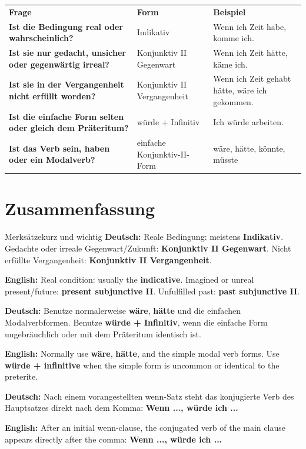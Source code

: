 \documentclass[a4paper,11pt]{article}
\newcommand{\GermanText}[1]{\textbf{Deutsch: }#1\par}
\newcommand{\EnglishText}[1]{{\small\color{SoftGray}\textbf{English: }#1\par}}
\begin{document}
        \begin{longtable}{>{\bfseries}p{5cm}|p{4cm}|p{4cm}}
            \rowcolor{HeaderBlueDark}
            \color{white}\textbf{Frage} &
            \color{white}\textbf{Form} &
            \color{white}\textbf{Beispiel} \\
            Ist die Bedingung real oder wahrscheinlich? & Indikativ & Wenn ich Zeit habe, komme ich. \\
            Ist sie nur gedacht, unsicher oder gegenwärtig irreal? & Konjunktiv II Gegenwart & Wenn ich Zeit hätte, käme ich. \\
            Ist sie in der Vergangenheit nicht erfüllt worden? & Konjunktiv II Vergangenheit & Wenn ich Zeit gehabt hätte, wäre ich gekommen. \\
            Ist die einfache Form selten oder gleich dem Präteritum? & würde + Infinitiv & Ich würde arbeiten. \\
            Ist das Verb sein, haben oder ein Modalverb? & einfache Konjunktiv-II-Form & wäre, hätte, könnte, müsste \\
        \end{longtable}

    \section{Zusammenfassung}

        \begin{grammarentry}{Merksätze}{kurz und wichtig}
            \GermanText{Reale Bedingung: meistens \textbf{Indikativ}. Gedachte oder irreale Gegenwart/Zukunft: \textbf{Konjunktiv II Gegenwart}. Nicht erfüllte Vergangenheit: \textbf{Konjunktiv II Vergangenheit}.}
            \EnglishText{Real condition: usually the \textbf{indicative}. Imagined or unreal present/future: \textbf{present subjunctive II}. Unfulfilled past: \textbf{past subjunctive II}.}

            \GermanText{Benutze normalerweise \textbf{wäre}, \textbf{hätte} und die einfachen Modalverbformen. Benutze \textbf{würde + Infinitiv}, wenn die einfache Form ungebräuchlich oder mit dem Präteritum identisch ist.}
            \EnglishText{Normally use \textbf{wäre}, \textbf{hätte}, and the simple modal verb forms. Use \textbf{würde + infinitive} when the simple form is uncommon or identical to the preterite.}

            \GermanText{Nach einem vorangestellten wenn-Satz steht das konjugierte Verb des Hauptsatzes direkt nach dem Komma: \textbf{Wenn ..., würde ich ...}}
            \EnglishText{After an initial wenn-clause, the conjugated verb of the main clause appears directly after the comma: \textbf{Wenn ..., würde ich ...}}
        \end{grammarentry}
\end{document}

